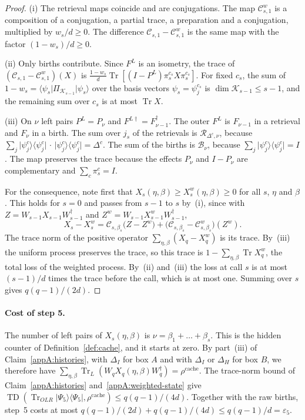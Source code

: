 \documentclass[11pt,letterpaper]{article}
\theoremstyle{definition}\newtheorem{definition}[theorem]{Definition}
\newcommand{\Tr}{\operatorname{Tr}}
\newcommand{\TD}{\operatorname{TD}}
\newcommand{\ket}[1]{\lvert#1\rangle}
\newcommand{\bra}[1]{\langle#1\rvert}
\newcommand{\proj}[1]{\ket{#1}\!\bra{#1}}
\begin{document}
\begin{proof}
(i) The retrieval maps coincide and are conjugations. The map
$\mathcal C^{w}_{s,1}$ is a composition of a conjugation, a partial trace, a
preparation and a conjugation, multiplied by $w_s/d\ge0$. The
difference $\mathcal C_{s,1}-\mathcal C^{w}_{s,1}$ is the same map with the
factor $(1-w_s)/d\ge0$.

(ii) Only births contribute. Since $F^L$ is an isometry, the trace of
$(\mathcal C_{s,1}-\mathcal C^{w}_{s,1})(X)$ is
$\frac{1-w_s}{d}\Tr[(I-P^L)\pi^{c_s}_sX\pi^{c_s}_s]$.
For fixed $c_s$, the sum of
$1-w_s=\bra{\psi_s}\Pi_{\mathcal K_{s-1}}\ket{\psi_s}$ over the basis
vectors $\psi_s=\psi^{c_s}_j$ is $\dim\mathcal K_{s-1}\le s-1$, and the
remaining sum over $c_s$ is at most $\Tr X$.

(iii) On $\nu$ left pairs $P^L=P_\nu$ and
$F^{L\dagger}=F_{\nu-1}^\dagger$. The outer $F^L$ is $F_{\nu-1}$ in a
retrieval and $F_\nu$ in a birth. The sum over $j_s$ of the
retrievals is $\mathcal R_{\Delta^c,\nu}$, because
$\sum_j\proj{\psi^c_j}\,\cdot\,\proj{\psi^c_j}=\Delta^c$. The sum of the
births is $\mathcal B_\nu$, because $\sum_j\proj{\psi^c_j}=I$. The map
preserves the trace because the effects $P_\nu$ and $I-P_\nu$ are
complementary and $\sum_c\pi^c_s=I$.

For the consequence, note first that
$X_s(\eta,\beta)\ge X^{w}_s(\eta,\beta)\ge0$ for all $s$, $\eta$ and
$\beta$. This holds for $s=0$ and passes from $s-1$ to $s$ by~(i),
since with $Z=W_{s-1}X_{s-1}W_{s-1}^\dagger$ and
$Z^{w}=W_{s-1}X^{w}_{s-1}W_{s-1}^\dagger$,
\[
 X_s-X^{w}_s=\mathcal C_{s,\beta_s}\bigl(Z-Z^{w}\bigr)
   +\bigl(\mathcal C_{s,\beta_s}-\mathcal C^{w}_{s,\beta_s}\bigr)(Z^{w}).
\]
The trace norm of the positive operator $\sum_{\eta,\beta}(X_q-X^{w}_q)$
is its trace. By~(iii) the uniform process preserves the trace, so this
trace is $1-\sum_{\eta,\beta}\Tr X^{w}_q$, the total loss of the
weighted process. By~(ii) and~(iii) the loss at call $s$ is at most
$(s-1)/d$ times the trace before the call, which is at most one.
Summing over $s$ gives $q(q-1)/(2d)$.
\end{proof}

\paragraph{Cost of step 5.}
The number of left pairs of $X_s(\eta,\beta)$ is
$\nu=\beta_1+\dots+\beta_s$. This is the hidden counter of
Definition~\ref{def:cache}, and it starts at zero. By part~(iii) of
Claim~\ref{appA:histories}, with $\Delta_I$ for box $A$ and with
$\Delta_I$ or $\Delta_H$ for box $B$, we therefore have
$\sum_{\eta,\beta}\Tr_L(W_qX_q(\eta,\beta)W_q^\dagger)
=\rho^{\mathrm{cache}}$. The trace-norm bound of
Claim~\ref{appA:histories} and~\eqref{appA:weighted-state} give
$\TD(\Tr_{OLR}\proj{\Psi_5},\rho^{\mathrm{cache}})\le q(q-1)/(4d)$.
Together with the raw births, step~5 costs at most
$q(q-1)/(2d)+q(q-1)/(4d)\le q(q-1)/d=\varepsilon_5$.
\end{document}
